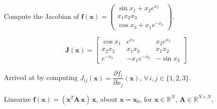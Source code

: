 \begin{exercise} %
    Compute the Jacobian of $\mathbf{f}(\mathbf{x}) = \begin{pmatrix} \sin x_1 + x_2 e^{x_3} \\ x_1 x_2 x_3 \\ \cos x_3 + x_1 e^{-x_2} \end{pmatrix}$.
\end{exercise}

\begin{solution}
    \[\displaystyle 
    \mathbf{J}(\mathbf{x}) = \begin{bmatrix} \cos x_1 & e^{x_3} & x_2 e^{x_3} \\ x_2 x_3 & x_1 x_3 & x_1 x_2 \\ e^{-x_2} & -x_1 e^{-x_2} & -\sin x_3 \end{bmatrix} \]
    
    Arrived at by computing \(J_{ij}(\mathbf{x}) = \dfrac{\partial f_i}{\partial x_j}(\mathbf{x}),\, \forall\, i,j \in \{1,2,3\}\).
\end{solution}

\begin{exercise} %
    Linearize $\mathbf{f}(\mathbf{x}) = (\mathbf{x}^T \mathbf{A}\,\mathbf{x})\,\mathbf{x}$, about $\mathbf{x} = \mathbf{x}_0$, for $\mathbf{x} \in \mathbb{R}^N$, $\mathbf{A} \in \mathbb{R}^{N \times N}$.
\end{exercise}

